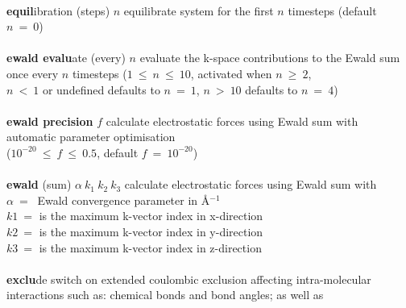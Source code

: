 \begin{tabbing}
\>                                              \> \\
\> {\bf equil}ibration (steps) $n$              \> equilibrate system for the first $n$ timesteps (default $n~=~0$) \\
\>                                              \> \\
\> {\bf ewald evalu}ate (every) $n$             \> evaluate the k-space contributions to the Ewald sum \\
\>                                              \> once every $n$ timesteps ($1~\le~n~\le~10$, activated when $n~\ge~2$, \\
\>                                              \> $n~<~1$ or undefined defaults to $n~=~1$, $n~>~10$ defaults to $n~=~4$) \\
\>                                              \> \\
\> {\bf ewald precision} $f$                    \> calculate electrostatic forces using Ewald sum with \\
\>                                              \> automatic parameter optimisation \\
\>                                              \> ($10^{-20}~\le~f~\le~0.5$, default $f~=~10^{-20}$) \\
\>                                              \> \\
\> {\bf ewald} (sum) $\alpha~k_{1}~k_{2}~k_{3}$ \> calculate electrostatic forces using Ewald sum with \\
\>                                              \> $\alpha~=~$ Ewald convergence parameter in \AA$^{-1}$ \\
\>                                              \> $k1~=$ is the maximum k-vector index in x-direction \\
\>                                              \> $k2~=$ is the maximum k-vector index in y-direction \\
\>                                              \> $k3~=$ is the maximum k-vector index in z-direction \\
\>                                              \> \\
\> {\bf exclu}de                                \> switch on extended coulombic exclusion affecting intra-molecular \\
\>                                              \> interactions such as: chemical bonds and bond angles; as well as \\

\end{tabbing}
